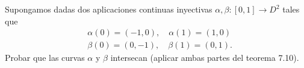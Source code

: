 \documentclass[twoside]{article}
\begin{document}
\newpage

\begin{ejercicio}{7.5}
Supongamos dadas dos aplicaciones continuas inyectivas $\alpha,\beta:[0,1]\to D^2$ tales que 
\begin{align*}
&\alpha(0)=(-1,0), \quad \alpha(1)=(1,0)\\
&\beta(0)=(0,-1), \quad \beta(1)=(0,1).
\end{align*}
Probar que las curvas $\alpha$ y $\beta$ intersecan (aplicar ambas partes del teorema 7.10). 
\end{ejercicio}
\begin{solucion}
\end{solucion}
\end{document}
